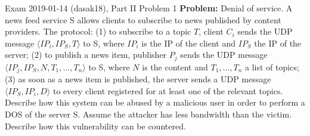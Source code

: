 \documentclass[12pt, a4paper]{article}
\begin{document}
\begin{practicebox}{Exam 2019-01-14 (dasak18), Part II Problem 1}
\textbf{Problem:} Denial of service. A news feed service S allows clients to subscribe to news published by content providers. The protocol: (1) to subscribe to a topic $T$, client $C_i$ sends the UDP message $\langle IP_i, IP_S, T \rangle$ to S, where $IP_i$ is the IP of the client and $IP_S$ the IP of the server; (2) to publish a news item, publisher $P_j$ sends the UDP message $\langle IP_j, IP_S, N, T_1, \dots, T_n \rangle$ to S, where $N$ is the content and $T_1, \dots, T_n$ a list of topics; (3) as soon as a news item is published, the server sends a UDP message $\langle IP_S, IP_i, D \rangle$ to every client registered for at least one of the relevant topics. Describe how this system can be abused by a malicious user in order to perform a DOS of the server S. Assume the attacker has less bandwidth than the victim. Describe how this vulnerability can be countered.


\end{practicebox}
\end{document}
